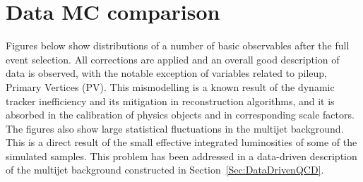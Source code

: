 \graphicspath{{chapt_dutch/}{intro/}{chapt2/}{chapt3/}{chapt4/}{chapt5/}{chapt6/}{chapt7/}{chapt8/}}

\renewcommand\evenpagerightmark{{\scshape\small Appendix C}}
\renewcommand\oddpageleftmark{{\scshape\small Data MC comparison}}

\renewcommand{\bibname}{References}

\hyphenation{}

\chapter[Data MC comparison]%
{Data MC comparison}\label{app4}
Figures below show distributions of a number of basic observables after the full event selection.
All corrections are applied and an overall good description of data is observed, with the notable exception of variables related to pileup, Primary Vertices (PV).
This mismodelling is a known result of the dynamic tracker inefficiency and its mitigation in reconstruction algorithms, and it is absorbed in the calibration of physics objects and in corresponding scale factors. The figures also show large statistical fluctuations in the multijet background.
This is a direct result of the small effective integrated luminosities of some of the simulated samples.
This problem has been addressed in a data-driven description of the multijet background constructed in Section~\ref{Sec:DataDrivenQCD}.
